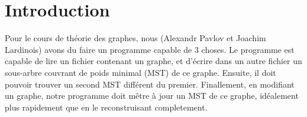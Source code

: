 \section{Introduction}

Pour le cours de théorie des graphes, nous (Alexandr Pavlov et Joachim Lardinois) avons du faire un programme capable de 3 choses.
Le programme est capable de lire un fichier contenant un graphe, et d'écrire dans un autre fichier un sous-arbre couvrant de poids minimal (MST) de ce graphe.
Ensuite, il doit pouvoir trouver un second MST différent du premier.
Finallement, en modifiant un graphe, notre programme doit mêtre à jour un MST de ce graphe, idéalement plus rapidement que en le reconstruisant completement.
